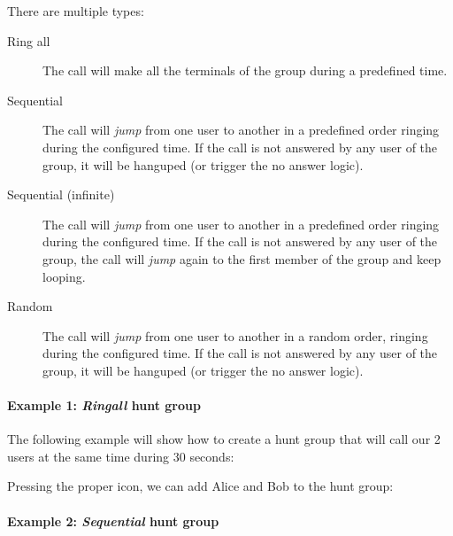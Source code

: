 \documentclass[letterpaper,10pt,english]{sphinxmanual}
\begin{document}
There are multiple types:
\begin{description}
\item[{Ring all}] \leavevmode{}\label{pbx_features/huntgroups:term-ring-all}
The call will make all the terminals of the group during a predefined
time.

\item[{Sequential}] \leavevmode{}\label{pbx_features/huntgroups:term-sequential}
The call will \emph{jump} from one user to another in a predefined order
ringing during the configured time. If the call is not answered by any
user of the group, it will be hanguped (or trigger the no answer logic).

\item[{Sequential (infinite)}] \leavevmode{}\label{pbx_features/huntgroups:term-sequential-infinite}
The call will \emph{jump} from one user to another in a predefined order
ringing during the configured time. If the call is not answered by any
user of the group, the call will \emph{jump} again to the first member of the
group and keep looping.

\item[{Random}] \leavevmode{}\label{pbx_features/huntgroups:term-random}
The call will \emph{jump} from one user to another in a random order,
ringing during the configured time.  If the call is not answered by any
user of the group, it will be hanguped (or trigger the no answer logic).

\end{description}
\paragraph{Example 1: \emph{Ringall} hunt group}

The following example will show how to create a hunt group that will call our 2
users at the same time during 30 seconds:

\noindent{}

Pressing the proper icon, we can add Alice and Bob to the hunt group:

\noindent{}
\paragraph{Example 2: \emph{Sequential} hunt group}
\end{document}
